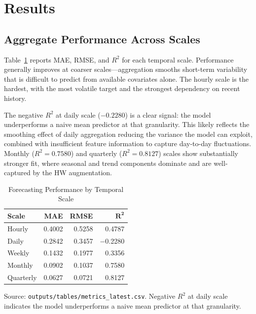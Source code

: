 \documentclass[10pt,twocolumn,letterpaper]{article}
\begin{document}
\section{Results}

\subsection{Aggregate Performance Across Scales}

Table~\ref{tab:metrics} reports MAE, RMSE, and $R^2$ for each
temporal scale. Performance generally improves at coarser
scales---aggregation smooths short-term variability that is difficult
to predict from available covariates alone. The hourly scale is the
hardest, with the most volatile target and the strongest dependency
on recent history.

The negative $R^2$ at daily scale ($-0.2280$) is a clear signal: the
model underperforms a naive mean predictor at that granularity. This
likely reflects the smoothing effect of daily aggregation reducing
the variance the model can exploit, combined with insufficient
feature information to capture day-to-day fluctuations. Monthly
($R^2 = 0.7580$) and quarterly ($R^2 = 0.8127$) scales show
substantially stronger fit, where seasonal and trend components
dominate and are well-captured by the HW augmentation.

\begin{table}[t]
  \caption{Forecasting Performance by Temporal Scale}
  \label{tab:metrics}
  \centering
  \setlength{\tabcolsep}{6pt}
  \begin{tabular}{lrrr}
    \toprule
    \textbf{Scale} & \textbf{MAE} & \textbf{RMSE} & $\bm{R^2}$ \\
    \midrule
    Hourly    & 0.4002 & 0.5258 & \phantom{$-$}0.4787 \\
    Daily     & 0.2842 & 0.3457 & $-$0.2280           \\
    Weekly    & 0.1432 & 0.1977 & \phantom{$-$}0.3356 \\
    Monthly   & 0.0902 & 0.1037 & \phantom{$-$}0.7580 \\
    Quarterly & 0.0627 & 0.0721 & \phantom{$-$}0.8127 \\
    \bottomrule
  \end{tabular}
  \par\smallskip
  {\footnotesize Source: \texttt{outputs/tables/metrics\_latest.csv}.
   Negative $R^2$ at daily scale indicates the model underperforms
   a naive mean predictor at that granularity.}
\end{table}
\end{document}
